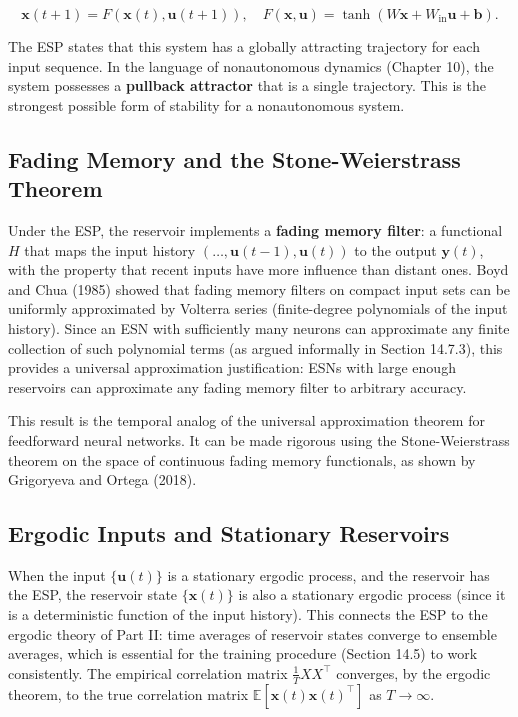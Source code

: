 \[
\mathbf{x}(t+1) = F(\mathbf{x}(t), \mathbf{u}(t+1)), \quad F(\mathbf{x}, \mathbf{u}) = \tanh(W\mathbf{x} + W_{\text{in}}\mathbf{u} + \mathbf{b}).
\]

The ESP states that this system has a globally attracting trajectory for each input sequence. In the language of nonautonomous dynamics (Chapter 10), the system possesses a \textbf{pullback attractor} that is a single trajectory. This is the strongest possible form of stability for a nonautonomous system.

\subsection{Fading Memory and the Stone-Weierstrass Theorem}\label{sec:14.8.2}

Under the ESP, the reservoir implements a \textbf{fading memory filter}: a functional $H$ that maps the input history $(\ldots, \mathbf{u}(t-1), \mathbf{u}(t))$ to the output $\mathbf{y}(t)$, with the property that recent inputs have more influence than distant ones. Boyd and Chua (1985) showed that fading memory filters on compact input sets can be uniformly approximated by Volterra series (finite-degree polynomials of the input history). Since an ESN with sufficiently many neurons can approximate any finite collection of such polynomial terms (as argued informally in Section 14.7.3), this provides a universal approximation justification: ESNs with large enough reservoirs can approximate any fading memory filter to arbitrary accuracy.

This result is the temporal analog of the universal approximation theorem for feedforward neural networks. It can be made rigorous using the Stone-Weierstrass theorem on the space of continuous fading memory functionals, as shown by Grigoryeva and Ortega (2018).

\subsection{Ergodic Inputs and Stationary Reservoirs}\label{sec:14.8.3}

When the input $\{\mathbf{u}(t)\}$ is a stationary ergodic process, and the reservoir has the ESP, the reservoir state $\{\mathbf{x}(t)\}$ is also a stationary ergodic process (since it is a deterministic function of the input history). This connects the ESP to the ergodic theory of Part II: time averages of reservoir states converge to ensemble averages, which is essential for the training procedure (Section 14.5) to work consistently. The empirical correlation matrix $\frac{1}{T}XX^\top$ converges, by the ergodic theorem, to the true correlation matrix $\mathbb{E}[\mathbf{x}(t)\mathbf{x}(t)^\top]$ as $T \to \infty$.


